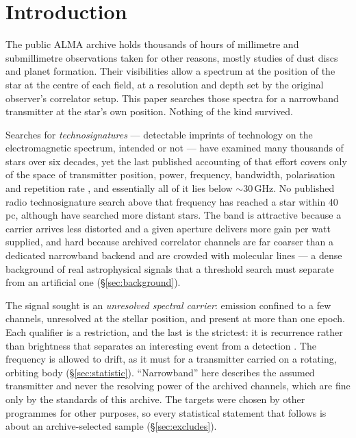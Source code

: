 \section{Introduction}
\label{sec:intro}

The public ALMA archive holds thousands of hours of millimetre and
submillimetre observations taken for other reasons, mostly studies of dust
discs and planet formation. Their visibilities allow a spectrum at the
position of the star at the centre of each field, at a resolution and depth
set by the original observer's correlator setup. This paper searches those
spectra for a narrowband transmitter at the star's own position. Nothing of
the kind survived.

Searches for \emph{technosignatures} --- detectable imprints of technology on
the electromagnetic spectrum, intended or not
\citep{Sheikh2020,SETIreview2025} --- have examined many thousands of stars
over six decades, yet the last published accounting of that effort covers
only \HaystackFrac{} of the space of transmitter position, power, frequency,
bandwidth, polarisation and repetition rate
\citep{Wright2018}, and essentially all of it lies below
${\sim}30$\,GHz. No published radio technosignature search above that
frequency has reached a star within 40\,pc, although \citet{Mason2025} have searched more distant stars. The
band is attractive because a carrier arrives less distorted and a given
aperture delivers more gain per watt supplied, and hard because archived
correlator channels are far coarser than a dedicated narrowband backend and
are crowded with molecular lines --- a dense background of real
astrophysical signals that a threshold search must separate from an
artificial one (\S\ref{sec:background}).

The signal sought is an \emph{unresolved spectral carrier}: emission confined
to a few channels, unresolved at the stellar position, and present at more
than one epoch. Each qualifier is a restriction, and the last is the
strictest: it is recurrence rather than brightness that separates an
interesting event from a detection \citep{Sheikh2021}. The frequency is
allowed to drift, as it must for a transmitter carried on a rotating,
orbiting body (\S\ref{sec:statistic}). ``Narrowband'' here describes the
assumed transmitter and never the resolving power of the archived channels,
which are fine only by the standards of this archive. The targets
were chosen by other programmes for other purposes, so every statistical
statement that follows is about an archive-selected sample
(\S\ref{sec:excludes}).
